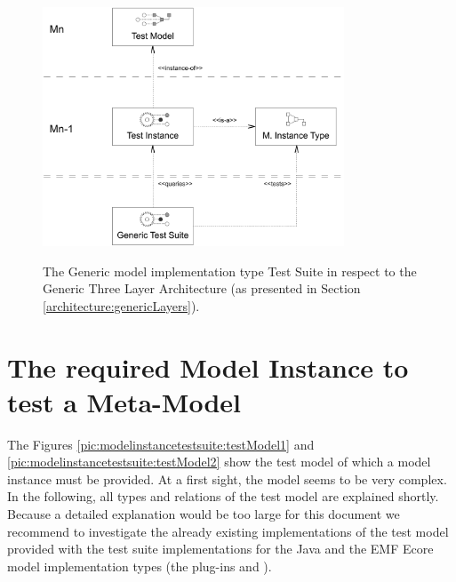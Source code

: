 \begin{figure}[!t]
	\centering
		\includegraphics[width=0.80\textwidth]{figures/modelinstancetestsuite/genericTestSuite.pdf}
	\label{pic:modelinstancetestsuite:genericTestSuite}
	\caption{The Generic model implementation type Test Suite in respect to the Generic Three Layer Ar\-chi\-tec\-ture (as presented in Section \ref{architecture:genericLayers}).}
\end{figure}



\section{The required Model Instance to test a Meta-Model}

The Figures \ref{pic:modelinstancetestsuite:testModel1} and \ref{pic:modelinstancetestsuite:testModel2} show the test model of which a model instance must be provided. At a first sight, the model seems to be very complex. In the following, all types and relations of the test model are explained shortly. Because a detailed explanation would be too large for this document we recommend to investigate the already existing implementations of the test model provided with the test suite implementations for the Java and the \acs{EMF} Ecore model implementation types (the plug-ins  and ).

